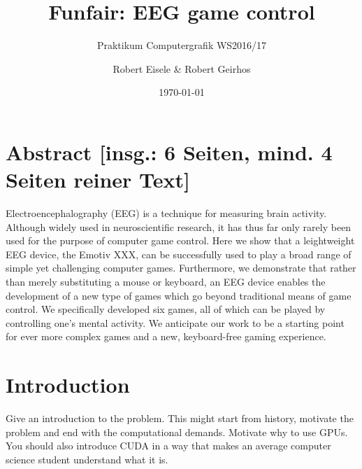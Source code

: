 \documentclass{utue} %
\title{Funfair: EEG game control}
\author{Robert Eisele \& Robert Geirhos}
\date{\today}
\subtitle{Praktikum Computergrafik WS2016/17}
\begin{document}

\maketitle

\section*{Abstract [insg.: 6 Seiten, mind. 4 Seiten reiner Text]}

Electroencephalography (EEG) is a technique for measuring brain activity. Although widely used in neuroscientific research, it has thus far only rarely been used for the purpose of computer game control. Here we show that a leightweight EEG device, the Emotiv XXX, can be successfully used to play a broad range of simple yet challenging computer games. Furthermore, we demonstrate that rather than merely substituting a mouse or keyboard, an EEG device enables the development of a new type of games which go beyond traditional means of game control. We specifically developed six games, all of which can be played by controlling one's mental activity. We anticipate our work to be a starting point for ever more complex games and a new, keyboard-free gaming experience.




\section{Introduction}

Give an introduction to the problem. This might start from history, motivate the problem and end with the computational demands. Motivate why to use GPUs. You should also introduce CUDA in a way that makes an average computer science student understand what it is.
\end{document}
